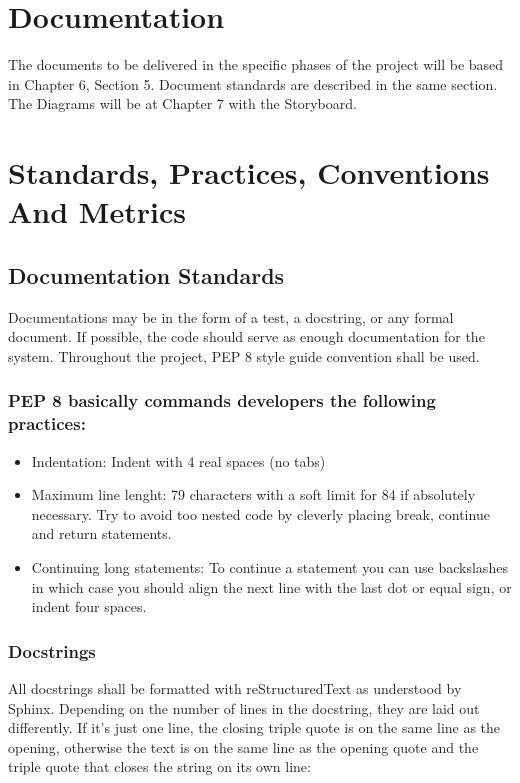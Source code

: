 \documentclass{report}
\begin{document}
\newpage
\section{Documentation}
The documents to be delivered in the specific phases of the project will be based in Chapter 6, Section 5. Document standards are described in the same section. The Diagrams will be at Chapter 7 with the Storyboard.

\newpage
\section{Standards, Practices, Conventions And Metrics}
\subsection{Documentation Standards}
Documentations may be in the form of a test, a docstring, or any formal document. If possible, the code should serve as enough documentation for the system. Throughout the project, PEP 8 style guide convention shall be used. 

\subsubsection{PEP 8 basically commands developers the following practices: }
\begin{itemize}
\item Indentation: Indent with 4 real spaces (no tabs)
\item Maximum line lenght: 79 characters with a soft limit for 84 if absolutely necessary. Try to avoid too nested code by cleverly placing break, continue and return statements.
\item Continuing long statements: To continue a statement you can use backslashes in which case you should align the next line with the last dot or equal sign, or indent four spaces.
\end{itemize}

\subsubsection{Docstrings}
All docstrings shall be formatted with reStructuredText as understood by Sphinx. Depending on the number of lines in the docstring, they are laid out differently. If it’s just one line, the closing triple quote is on the same line as the opening, otherwise the text is on the same line as the opening quote and the triple quote that closes the string on its own line:
\end{document}
